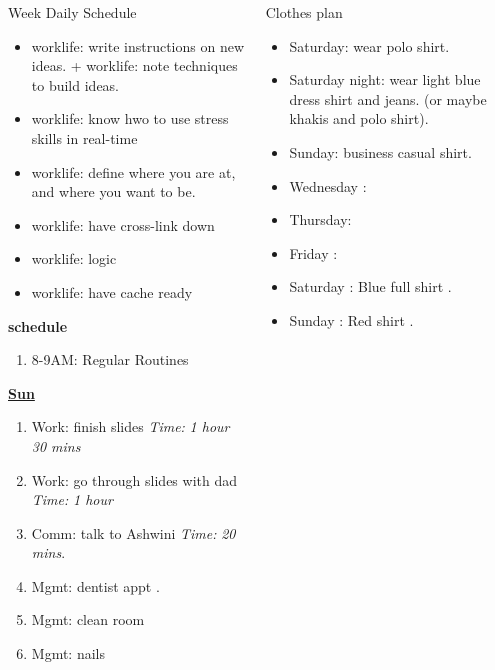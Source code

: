 \documentclass[serif, mathserif, final]{beamer}
\newcommand{\timeEst}[1]{\textit{Time:} \textit{#1}}
\begin{document}
\begin{frame}{}
\begin{columns}
\begin{column}{0.50\linewidth}
\begin{block}{Week Daily Schedule}
\begin{itemize}
\item \tiny worklife: write instructions on new ideas.  + worklife: note techniques to build ideas.  

\item \tiny worklife: know hwo to use stress skills in real-time 

\item \tiny worklife: define where you are at, and where you want to be. 

\item \tiny worklife: have cross-link down  
\item \tiny worklife: logic 
\item \tiny worklife: have cache ready 
\end{itemize} 

\textbf{\small schedule} 
\begin{enumerate} 
  \tiny \item \tiny 8-9AM: Regular Routines 
\end{enumerate}  

\textbf{\small \underline{Sun}}
\begin{enumerate} 
\tiny \item \tiny Work: finish slides \timeEst{1 hour 30 mins} 
\item \tiny Work: go through slides with dad \timeEst{1 hour} 
\item \tiny Comm: talk to Ashwini \timeEst{20 mins}. 
\item \tiny Mgmt: dentist appt .
\item \tiny Mgmt: clean room 
\item \tiny Mgmt: nails 
\end{enumerate} 
\end{block} 

\end{column}%
\begin{column}{0.20\linewidth}
  \begin{block}{Clothes plan} 
    \begin{itemize} 
      \tiny \item \tiny Saturday: wear polo shirt. 
    \item \tiny Saturday night: wear light blue dress shirt and jeans. (or maybe khakis and polo shirt). 
    \item \tiny Sunday: business casual shirt. 
    \item \tiny Wednesday : 
    \item \tiny Thursday: 
    \item \tiny Friday : 
    \item \tiny Saturday : Blue full shirt . 
    \item \tiny Sunday : Red shirt .
    \end{itemize} 
  \end{block}


\end{column}
\end{columns}
\end{frame}
\end{document}
